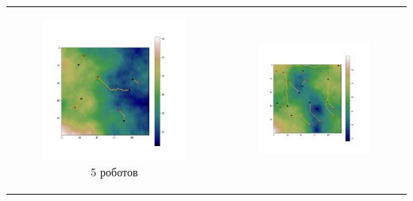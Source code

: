 \documentclass{article}
\numberwithin{equation}{section}
\begin{document}
	\begin{table}[H]
		\begin{tabular}{c c}
			\begin{subfigure}{0.5\linewidth}
				\includegraphics[width = 1.0\columnwidth]{data/mean_paths/100x100/5.png}
			\caption*{5 роботов}
			\end{subfigure}
			&
			\begin{subfigure}{0.5\linewidth}
				\includegraphics[width = 1.0\columnwidth]{data/mean_paths/100x100/10.png}

\end{subfigure}
\end{tabular}
\end{table}
\end{document}
